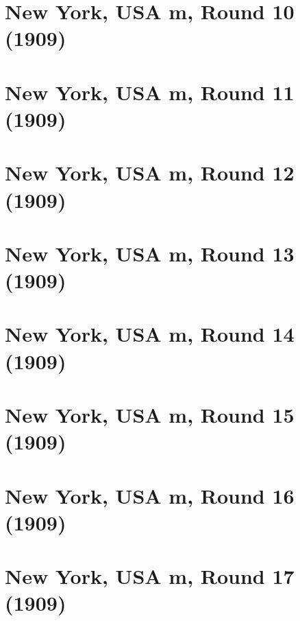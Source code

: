 \documentclass[11pt]{article}
\begin{document}
\clearpage

\section{New York, USA m, Round 10 (1909)}


\clearpage

\section{New York, USA m, Round 11 (1909)}


\clearpage

\section{New York, USA m, Round 12 (1909)}


\clearpage

\section{New York, USA m, Round 13 (1909)}


\clearpage

\section{New York, USA m, Round 14 (1909)}


\clearpage

\section{New York, USA m, Round 15 (1909)}


\clearpage

\section{New York, USA m, Round 16 (1909)}


\clearpage

\section{New York, USA m, Round 17 (1909)}


\clearpage
\end{document}
